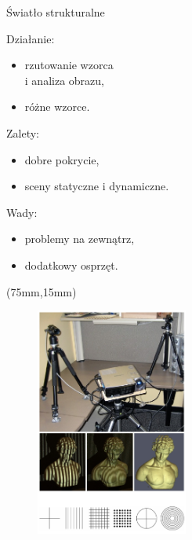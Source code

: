 \documentclass[xcolor=x11names,compress]{beamer}
\renewcommand{\(}{\begin{columns}}
\renewcommand{\)}{\end{columns}}
\newcommand{\<}[1]{\begin{column}{#1}}
\renewcommand{\>}{\end{column}}
\begin{document}
\begin{frame}{Światło strukturalne}

\alert{Działanie:}
\begin{itemize}
\item rzutowanie wzorca \\i analiza obrazu,
\item różne wzorce.
\end{itemize}

\vspace{.2cm}

\alert{Zalety:}
\begin{itemize}
\item dobre pokrycie,
\item sceny statyczne i dynamiczne.
\end{itemize}

\vspace{.2cm}

\alert{Wady:}
\begin{itemize}
\item problemy na zewnątrz,
\item dodatkowy osprzęt.
\end{itemize}

\begin{textblock*}{50mm}(75mm,15mm)%
    \begin{minipage}[l]{50mm}%

	\begin{figure}[h!]
    \centering
    \includegraphics[width=5.0cm]{../Common/img/struct_vert}
    \end{figure}

    \end{minipage}
\end{textblock*}

\end{frame}
\end{document}
